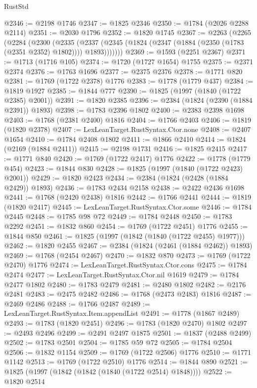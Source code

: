\begin{lexlean}{RustStd}
\begin{coremodule}
@2346 := @2198 @1746
@2347 := @1825 @2346
@2350 := @1784 (@2026 @2288 @2114)
@2351 := @2030 @1796
@2352 := @1820 @1745
@2367 := @2263
    (@2265
      (@2284
        (@2300
          (@2335
            (@2337 (@2345 (@1824 (@2347 (@1884 (@2350 (@1783 (@2351 @2352) @1802)))) @1893)))))))
@2369 := @1593 (@2251 @2367)
@2371 := @1713 (@1716 @105)
@2374 := @1720 (@1727 @1654) @1755
@2375 := @2371 @2374
@2376 := @1763 @1696
@2377 := @2375 @2376
@2378 := @1771 @820
@2381 := @1769 (@1722 @2378) @1776
@2383 := @1778 (@1779 @437)
@2384 := @1819 @1927
@2385 := @1844 @777
@2390 := @1825 (@1997 (@1840 (@1722 @2385) @2001))
@2391 := @1820 @2385
@2396 := @2384 (@1824 (@2390 (@1884 @2391)) @1893)
@2398 := @1783 @2396 @1802
@2400 := @2383 @2398 @1698
@2403 := @1768 (@2381 @2400) @1816
@2404 := @1766 @2403
@2406 := @1819 (@1820 @2378)
@2407 := LexLeanTarget.RustSyntax.Ctor.none
@2408 := @2407 @1654
@2410 := @1784 @2408 @1802
@2411 := @1866 @2410
@2414 := @1824 (@2169 (@1884 @2411))
@2415 := @2198 @1731
@2416 := @1825 @2415
@2417 := @1771 @840
@2420 := @1769 (@1722 @2417) @1776
@2422 := @1778 (@1779 @454)
@2423 := @1844 @830
@2428 := @1825 (@1997 (@1840 (@1722 @2423) @2001))
@2429 := @1820 @2423
@2434 := @2384 (@1824 (@2428 (@1884 @2429)) @1893)
@2436 := @1783 @2434 @2158
@2438 := @2422 @2436 @1698
@2441 := @1768 (@2420 @2438) @1816
@2442 := @1766 @2441
@2444 := @1819 (@1820 @2417)
@2445 := LexLeanTarget.RustSyntax.Ctor.some
@2446 := @1784 @2445
@2448 := @1785 @98 @72
@2449 := @1784 @2448
@2450 := @1783 @2292
@2451 := @1832 @860
@2454 := @1769 (@1722 @2451) @1776
@2455 := @1844 @850
@2461 := @1825 (@1997 (@1842 (@1840 (@1722 @2455) @1977)))
@2462 := @1820 @2455
@2467 := @2384 (@1824 (@2461 (@1884 @2462)) @1893)
@2469 := @1768 (@2454 @2467)
@2470 := @1832 @870
@2473 := @1769 (@1722 @2470) @1776
@2474 := LexLeanTarget.RustSyntax.Ctor.cons
@2475 := @1784 @2474
@2477 := LexLeanTarget.RustSyntax.Ctor.nil @1619
@2479 := @1784 @2477 @1802
@2480 := @1783 @2479
@2481 := @2480 @1802
@2482 := @2176 @2481
@2483 := @2475 @2482
@2486 := @1768 (@2473 @2483) @1816
@2487 := @2469 @2486
@2488 := @1766 @2487
@2489 := LexLeanTarget.RustSyntax.Item.appendList
@2491 := @1778 (@1867 @2489)
@2493 := @1783 (@1820 @2451)
@2496 := @1783 (@1820 @2470) @1802
@2497 := @2493 @2496
@2499 := @2491 @2497 @1875
@2501 := @1837 (@2488 @2499)
@2502 := @1783 @2501
@2504 := @1785 @59 @72
@2505 := @1784 @2504
@2506 := @1832 @1154
@2509 := @1769 (@1722 @2506) @1776
@2510 := @1771 @1142
@2513 := @1769 (@1722 @2510) @1776
@2514 := @1844 @890
@2521 := @1825 (@1997 (@1842 (@1842 (@1840 (@1722 @2514) @1848))))
@2522 := @1820 @2514

\end{coremodule}
\end{lexlean}
